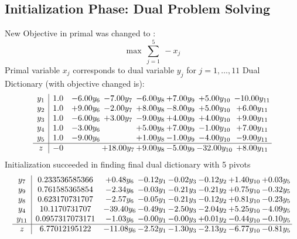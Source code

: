 \documentclass[8pt]{article}
\begin{document}
\subsection{Initialization Phase: Dual Problem Solving}
New Objective in primal was changed to : \[ \max\ \sum_{j=1}^{5}\ - x_j \] 
Primal variable $x_j$ corresponds to dual variable $y_j$ for $j = 1,\ldots,11$
Dual Dictionary (with objective changed is): 
\[\begin{array}{c| c c@{\hskip 2pt} c@{\hskip 2pt} c@{\hskip 2pt} c@{\hskip 2pt} c@{\hskip 2pt} c@{\hskip 2pt} }
 y_{1}   &  1.0 & -6.00 y_{6} & -7.00 y_{7} & -6.00 y_{8} & +  7.00 y_{9} & +  5.00 y_{10} & -10.00 y_{11}\\
 y_{2}   &  1.0 & +  9.00 y_{6} & -2.00 y_{7} & +  8.00 y_{8} & -8.00 y_{9} & +  5.00 y_{10} & +  6.00 y_{11}\\
 y_{3}   &  1.0 & -6.00 y_{6} & +  3.00 y_{7} & -9.00 y_{8} & +  4.00 y_{9} & +  4.00 y_{10} & +  9.00 y_{11}\\
 y_{4}   &  1.0 & -3.00 y_{6} &   & +  5.00 y_{8} & +  7.00 y_{9} & -1.00 y_{10} & +  7.00 y_{11}\\
 y_{5}   &  1.0 & -9.00 y_{6} &   & +  1.00 y_{8} & -1.00 y_{9} & -4.00 y_{10} & -9.00 y_{11}\\
\hline
z    &  -0  &   & + 18.00 y_{7} & +  9.00 y_{8} & -5.00 y_{9} & -32.00 y_{10} & +  8.00 y_{11}\\
\end{array}\]
Initialization succeeded in finding final dual dictionary with 5 pivots
\[\begin{array}{c| c c@{\hskip 2pt} c@{\hskip 2pt} c@{\hskip 2pt} c@{\hskip 2pt} c@{\hskip 2pt} c@{\hskip 2pt} }
 y_{7}   &  0.233536585366 & +  0.48 y_{6} & -0.12 y_{1} & -0.02 y_{3} & -0.12 y_{2} & +  1.40 y_{10} & +  0.03 y_{5}\\
 y_{9}   &  0.761585365854 & -2.34 y_{6} & -0.03 y_{1} & -0.21 y_{3} & -0.21 y_{2} & +  0.75 y_{10} & -0.32 y_{5}\\
 y_{8}   &  0.623170731707 & -2.57 y_{6} & -0.05 y_{1} & -0.21 y_{3} & -0.12 y_{2} & +  0.81 y_{10} & -0.23 y_{5}\\
 y_{4}   &  10.1170731707 & -39.40 y_{6} & -0.49 y_{1} & -2.50 y_{3} & -2.04 y_{2} & +  5.25 y_{10} & -4.09 y_{5}\\
 y_{11}   &  0.0957317073171 & -1.03 y_{6} & -0.00 y_{1} & -0.00 y_{3} & +  0.01 y_{2} & -0.44 y_{10} & -0.10 y_{5}\\
\hline
z    &  6.77012195122 & -11.08 y_{6} & -2.52 y_{1} & -1.30 y_{3} & -2.13 y_{2} & -6.77 y_{10} & -0.81 y_{5}\\
\end{array}\]
\end{document}
